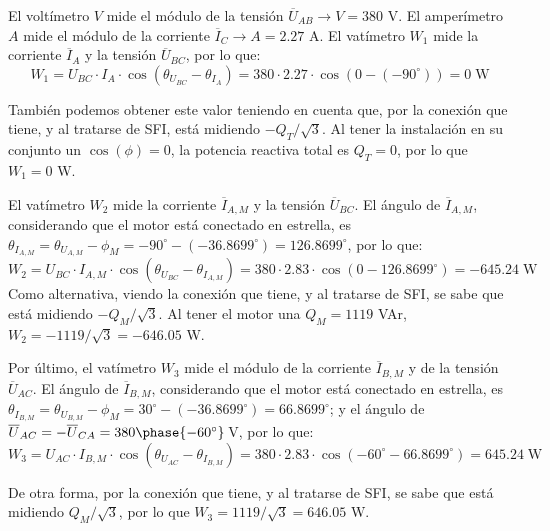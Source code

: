 El voltímetro $V$ mide el módulo de la tensión
$\overline{U}_{AB}\rightarrow V={380}$ {V}. El amperímetro $A$ mide el
módulo de la corriente $\overline{I}_C\rightarrow A={2.27}$ {A}. El
vatímetro $W_1$ mide la corriente $\overline{I}_A$ y la tensión
$\overline{U}_{BC}$, por lo que:
\begin{equation*}
  W_1=U_{BC}\cdot I_A\cdot \cos{(\theta_{{U}_{BC}}-\theta_{{I}_A})}= 380\cdot 2.27\cdot \cos(0-(-90^\circ))={0\;\text{W}}
\end{equation*}

También podemos obtener este valor teniendo en cuenta que, por la
conexión que tiene, y al tratarse de SFI, está midiendo
$-Q_T/\sqrt{3}$. Al tener la instalación en su conjunto un
$\cos(\phi)=0$, la potencia reactiva total es $Q_T=0$, por lo que
$W_1=0$ W.

\vspace{3mm}
El vatímetro $W_2$ mide la corriente $\overline{I}_{A,M}$ y la tensión
$\overline{U}_{BC}$. El ángulo de $\overline{I}_{A,M}$, considerando
que el motor está conectado en estrella, es
$\theta_{{I}_{A,M}}=\theta_{{U}_{A,M}}-\phi_M=-90^\circ-(-36.8699^\circ)=126.8699^\circ$,
por lo que:
\begin{equation*}
  W_2=U_{BC}\cdot I_{A,M}\cdot \cos{(\theta_{{U}_{BC}}-\theta_{{I}_{A,M}})}= 380\cdot 2.83\cdot \cos(0-126.8699^\circ)={-645.24\;\text{W}}
\end{equation*}
Como alternativa, viendo la conexión que tiene, y al tratarse de SFI,
se sabe que está midiendo $-Q_M/\sqrt{3}$. Al tener el motor una
$Q_M=1119$ VAr, $W_2=-1119/\sqrt{3}=-646.05$ W.

  \vspace{3mm}
Por último, el vatímetro $W_3$ mide el módulo de la corriente
$\overline{I}_{B,M}$ y de la tensión $\overline{U}_{AC}$. El ángulo de
$\overline{I}_{B,M}$, considerando que el motor está conectado en
estrella, es
$\theta_{I_{B,M}}=\theta_{U_{B,M}}-\phi_M=30^\circ-(-36.8699^\circ)=66.8699^\circ$;
y el ángulo de
$\overline{U}_{AC}=-\overline{U}_{CA}=380\phase{-60^\circ}$\,\si{\volt}, por lo
que:
\begin{equation*}
  W_3=U_{AC}\cdot I_{B,M}\cdot \cos{(\theta_{{U}_{AC}}-\theta_{{I}_{B,M}})}= 380\cdot 2.83\cdot \cos(-60^\circ-66.8699^\circ)={645.24\;\text{W}}
\end{equation*}

De otra forma, por la conexión que tiene, y al tratarse de SFI, se
sabe que está midiendo $Q_M/\sqrt{3}$, por lo que
$W_3=1119/\sqrt{3}=646.05$ W.


